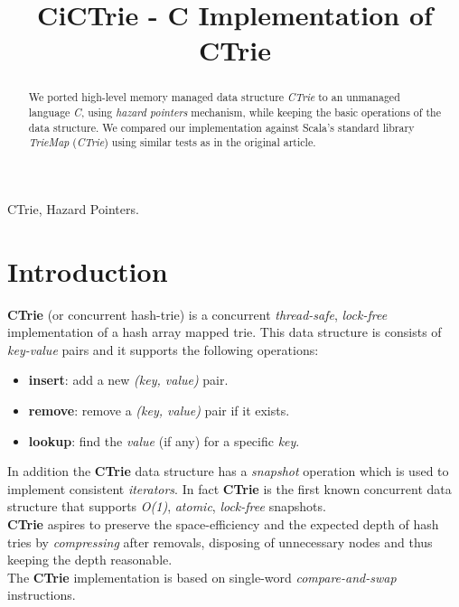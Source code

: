 \documentclass[conference]{IEEEtran}
\begin{document}
%
\title{CiCTrie - C Implementation of CTrie}

\author{
\and
{}
}

\maketitle


\begin{abstract}
	We ported high-level memory managed data structure \textit{CTrie} to an unmanaged language \textit{C}, using \textit{hazard pointers} mechanism, while keeping the basic operations of the data structure. We compared our implementation against Scala's standard library \textit{TrieMap} (\textit{CTrie}) using similar tests as in the original article.
\end{abstract}

\begin{IEEEkeywords}
	CTrie, Hazard Pointers.
\end{IEEEkeywords}

\IEEEpeerreviewmaketitle

\section{Introduction}
		\textbf{CTrie}\cite{article}\cite{wiki-ctrie} (or concurrent hash-trie) is a concurrent \textit{thread-safe}, \textit{lock-free} implementation of a hash array mapped trie. This data structure is consists of \textit{key-value} pairs and it supports the following operations:
		\begin{itemize}
			\item \textbf{insert}: add a new \textit{(key, value)} pair.
			\item \textbf{remove}: remove a \textit{(key, value)} pair if it exists.
			\item \textbf{lookup}: find the \textit{value} (if any) for a specific \textit{key}. 
		\end{itemize}
		In addition the \textbf{CTrie} data structure has a \textit{snapshot} operation which is used to implement consistent \textit{iterators}. In fact \textbf{CTrie} is the first known concurrent data structure that supports \textit{O(1)}, \textit{atomic}, \textit{lock-free} snapshots.\\
		\textbf{CTrie} aspires to preserve the space-efficiency and the expected depth of hash tries by \textit{compressing} after removals, disposing of unnecessary nodes and thus keeping the depth reasonable.\\
		The \textbf{CTrie} implementation is based on single-word \textit{compare-and-swap} instructions. 
\end{document}
